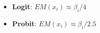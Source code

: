\begin{itemize}
    \item \textbf{Logit}: $EM(x_i) \approx \beta_i/4$
    \item \textbf{Probit}: $EM(x_i) \approx \beta_i/2.5$
\end{itemize}




